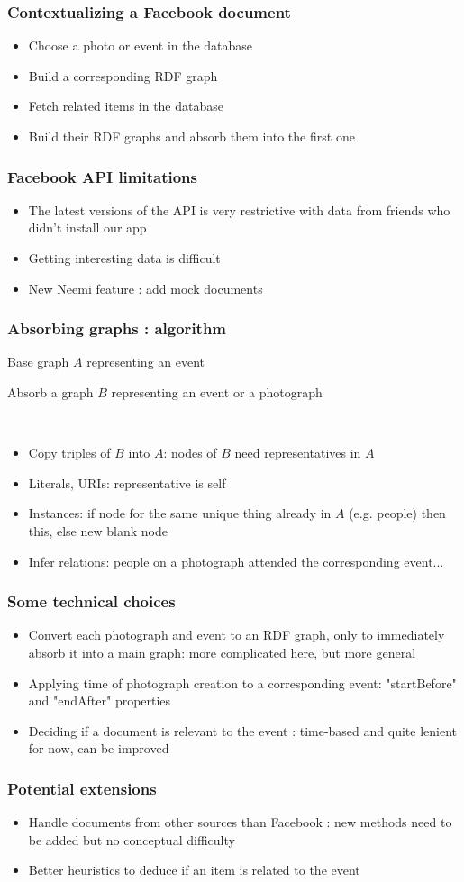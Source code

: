 \documentclass[18pt]{beamer}
\begin{document}
\begin{frame}
	\frametitle{Contextualizing a Facebook document}
	\begin{itemize}
		\item{Choose a photo or event in the database}
		\item{Build a corresponding RDF graph}
		\item{Fetch related items in the database}
		\item{Build their RDF graphs and absorb them into the first one}
	\end{itemize}
\end{frame}
\begin{frame}
	\frametitle{Facebook API limitations}
	\begin{itemize}
		\item{The latest versions of the API is very restrictive with data from friends who didn't install our app}
		\item{Getting interesting data is difficult}
		\item{New Neemi feature : add mock documents}
	\end{itemize}
\end{frame}
\begin{frame}
	\frametitle{Absorbing graphs : algorithm}
			Base graph $A$ representing an event
			
			Absorb a graph $B$ representing an event or a photograph
			
			\
	\begin{itemize}
		\item{Copy triples of $B$ into $A$: nodes of $B$ need representatives in $A$}
		\item{Literals, URIs: representative is self}
		\item{Instances: if node for the same unique thing already in $A$ (e.g. people) then this, else new blank node}
		\item{Infer relations: people on a photograph attended the corresponding event...}
	\end{itemize}
\end{frame}
\begin{frame}
	\frametitle{Some technical choices}
	\begin{itemize}
		\item{Convert each photograph and event to an RDF graph, only to immediately absorb it into a main graph: more complicated here, but more general}
		\item{Applying time of photograph creation to a corresponding event: "startBefore" and "endAfter" properties}
		\item{Deciding if a document is relevant to the event : time-based and quite lenient for now, can be improved}
	\end{itemize}
\end{frame}
\begin{frame}
	\frametitle{Potential extensions}
	\begin{itemize}
		\item{Handle documents from other sources than Facebook : new methods need to be added but no conceptual difficulty}
		\item{Better heuristics to deduce if an item is related to the event}
	\end{itemize}
\end{frame}
\end{document}

